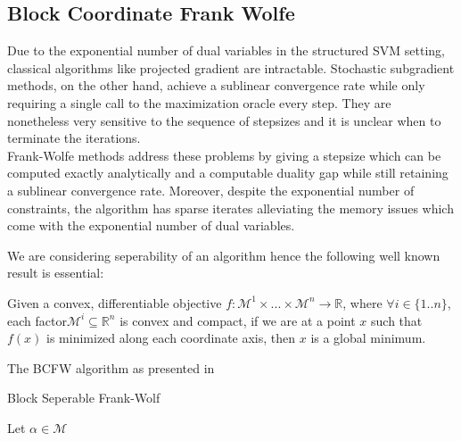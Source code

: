 \subsection{Block Coordinate Frank Wolfe}
Due to the exponential number of dual variables in the structured SVM setting,
classical algorithms like projected gradient are intractable. Stochastic
subgradient methods, on the other hand, achieve a sublinear convergence rate
while only requiring a single call to the maximization oracle every step. They
are nonetheless very sensitive to the sequence of stepsizes and it is unclear
when to terminate the iterations. \\

Frank-Wolfe methods address these problems by giving a stepsize which
can be computed exactly analytically and a computable duality gap while still
retaining a sublinear convergence rate. Moreover, despite the exponential number
of constraints, the algorithm has sparse iterates alleviating the memory issues
which come with the exponential number of dual variables.

We are considering seperability of an algorithm hence the following
well known result is essential:
\begin{theorem}
  Given a convex, differentiable objective
$f:\mathcal{M}^{1}\times...\times\mathcal{M}^{n}\to\mathbb{R}$, where $\forall
i\in\{1..n\}$, each factor\quad $\mathcal{M}^{i}\subseteq\mathbb{R}^{n}$ is
convex and compact, if we are at a point $x$ such that $f(x)$ is minimized along
each coordinate axis, then $x$ is a global minimum.
\end{theorem}

The BCFW algorithm as presented in \citet{lacoste-julienBlockCoordinateFrankWolfeOptimization2013}

\begin{algorithm}
  \caption{Block Seperable Frank-Wolf}
  \label{alg:bcgfw}
\begin{algorithmic}
   \STATE Let $\alpha\in\mathcal{M}$
    \\
        \\
        \\
        \\
        \\
      \ENDFOR
   \ENDFOR
\end{algorithmic}
\end{algorithm}

